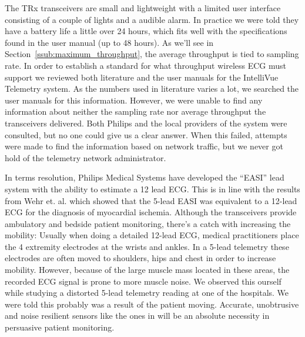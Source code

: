 The TRx transceivers are small and lightweight with a limited user interface consisting of a couple of lights and a audible alarm. In practice we were told they have a battery life a little over 24 hours, which fits well with the specifications found in the user manual (up to 48 hours). As we'll see in Section~\ref{ssub:maximum_throughput}, the average throughput is tied to sampling rate. In order to establish a standard for what throughput wireless ECG must support we reviewed both literature and the user manuals for the IntelliVue Telemetry system. As the numbers used in literature varies a lot, we searched the user manuals for this information. However, we were unable to find any information about neither the sampling rate nor average throughput the transceivers delivered. Both Philips and the local providers of the system were consulted, but no one could give us a clear answer. When this failed, attempts were made to find the information based on network traffic, but we never got hold of the telemetry network administrator.

In terms resolution, Philips Medical Systems have developed the ``EASI'' lead system with the ability to estimate a 12 lead ECG. This is in line with the results from \cite{Wehr:2006ht} Wehr et. al. which showed that the 5-lead EASI was equivalent to a 12-lead ECG for the diagnosis of myocardial ischemia. Although the transceivers provide ambulatory and bedside patient monitoring, there's a catch with increasing the mobility: Usually when doing a detailed 12-lead ECG, medical practitioners place the 4 extremity electrodes at the wrists and ankles. In a 5-lead telemetry these electrodes are often moved to shoulders, hips and chest in order to increase mobility. However, because of the large muscle mass located in these areas, the recorded ECG signal is prone to more muscle noise. We observed this ourself while studying a distorted 5-lead telemetry reading at one of the hospitals. We were told this probably was a result of the patient moving. Accurate, unobtrusive and noise resilient sensors like the ones in \cite{ChulsungPark:2006tf, Anonymous:FtVb5yQr} will be an absolute necessity in persuasive patient monitoring. 

